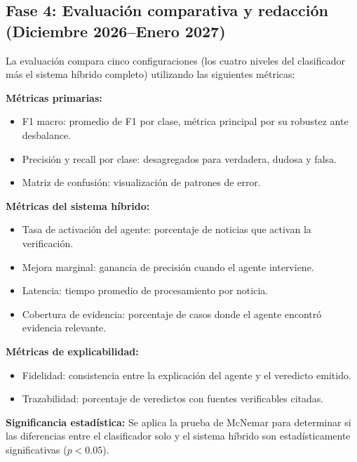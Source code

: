 \subsection{Fase 4: Evaluación comparativa y redacción (Diciembre 2026--Enero 2027)}

La evaluación compara cinco configuraciones (los cuatro niveles del clasificador más el sistema híbrido completo) utilizando las siguientes métricas:

\textbf{Métricas primarias:}
\begin{itemize}
    \item F1 macro: promedio de F1 por clase, métrica principal por su robustez ante desbalance.
    \item Precisión y recall por clase: desagregados para verdadera, dudosa y falsa.
    \item Matriz de confusión: visualización de patrones de error.
\end{itemize}

\textbf{Métricas del sistema híbrido:}
\begin{itemize}
    \item Tasa de activación del agente: porcentaje de noticias que activan la verificación.
    \item Mejora marginal: ganancia de precisión cuando el agente interviene.
    \item Latencia: tiempo promedio de procesamiento por noticia.
    \item Cobertura de evidencia: porcentaje de casos donde el agente encontró evidencia relevante.
\end{itemize}

\textbf{Métricas de explicabilidad:}
\begin{itemize}
    \item Fidelidad: consistencia entre la explicación del agente y el veredicto emitido.
    \item Trazabilidad: porcentaje de veredictos con fuentes verificables citadas.
\end{itemize}

\textbf{Significancia estadística:} Se aplica la prueba de McNemar para determinar si las diferencias entre el clasificador solo y el sistema híbrido son estadísticamente significativas ($p < 0.05$).
